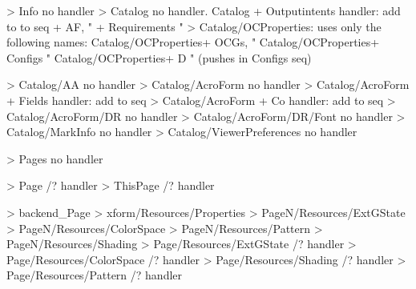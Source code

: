 >  {Info}                                 no handler
>  {Catalog}                              no handler.
   {Catalog}             + Outputintents  handler: add to to seq
                         + AF,             "
                         + Requirements    "
>  {Catalog/OCProperties}: uses only the following names:
   {Catalog/OCProperties}+ OCGs,           "
   {Catalog/OCProperties}+ Configs         "
   {Catalog/OCProperties}+ D               " (pushes in Configs seq)

>  {Catalog/AA}                            no handler
>  {Catalog/AcroForm}                      no handler
>  {Catalog/AcroForm}    + Fields          handler: add to seq
>  {Catalog/AcroForm}    + Co              handler: add to seq
>  {Catalog/AcroForm/DR}                   no handler
>  {Catalog/AcroForm/DR/Font}              no handler
>  {Catalog/MarkInfo}                      no handler
>  {Catalog/ViewerPreferences}             no handler

>  {Pages}                                 no handler

>  {Page}                                /? handler
>  {ThisPage}                            /? handler

>  {backend_Page}
>  {xform/Resources/Properties}
>  {PageN/Resources/ExtGState}
>  {PageN/Resources/ColorSpace}
>  {PageN/Resources/Pattern}
>  {PageN/Resources/Shading}
>  {Page/Resources/ExtGState}           /? handler
>  {Page/Resources/ColorSpace}          /? handler
>  {Page/Resources/Shading}             /? handler
>  {Page/Resources/Pattern}             /? handler

